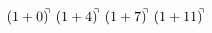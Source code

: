 \documentclass[preview]{standalone}
\begin{document}
\begin{align*}
(1+0)^{\hspace{-0.1cm}\urcorner} \ (1+4)^{\hspace{-0.1cm}\urcorner} \ (1+7)^{\hspace{-0.1cm}\urcorner} \ (1+11)^{\hspace{-0.1cm}\urcorner}
\end{align*}
\end{document}

